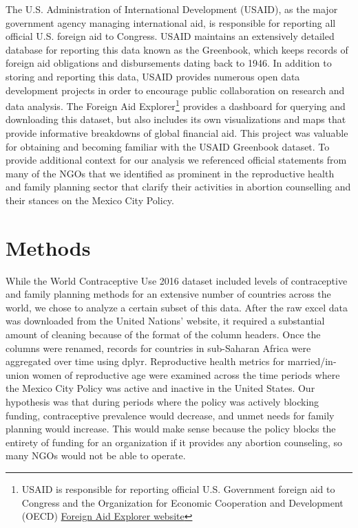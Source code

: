 \documentclass[11pt,]{article}
\begin{document}
The U.S. Administration of International Development (USAID), as the
major government agency managing international aid, is responsible for
reporting all official U.S. foreign aid to Congress. USAID maintains an
extensively detailed database for reporting this data known as the
Greenbook, which keeps records of foreign aid obligations and
disbursements dating back to 1946. In addition to storing and reporting
this data, USAID provides numerous open data development projects in
order to encourage public collaboration on research and data analysis.
The Foreign Aid Explorer\footnote{USAID is responsible for reporting
  official U.S. Government foreign aid to Congress and the Organization
  for Economic Cooperation and Development (OECD)
  \href{https://explorer.usaid.gov/aid-dashboard.html}{Foreign Aid
  Explorer website}} provides a dashboard for querying and downloading
this dataset, but also includes its own visualizations and maps that
provide informative breakdowns of global financial aid. This project was
valuable for obtaining and becoming familiar with the USAID Greenbook
dataset. To provide additional context for our analysis we referenced
official statements from many of the NGOs that we identified as
prominent in the reproductive health and family planning sector that
clarify their activities in abortion counselling and their stances on
the Mexico City Policy.

\section{Methods}\label{methods}

While the World Contraceptive Use 2016 dataset included levels of
contraceptive and family planning methods for an extensive number of
countries across the world, we chose to analyze a certain subset of this
data. After the raw excel data was downloaded from the United Nations'
website, it required a substantial amount of cleaning because of the
format of the column headers. Once the columns were renamed, records for
countries in sub-Saharan Africa were aggregated over time using dplyr.
Reproductive health metrics for married/in-union women of reproductive
age were examined across the time periods where the Mexico City Policy
was active and inactive in the United States. Our hypothesis was that
during periods where the policy was actively blocking funding,
contraceptive prevalence would decrease, and unmet needs for family
planning would increase. This would make sense because the policy blocks
the entirety of funding for an organization if it provides any abortion
counseling, so many NGOs would not be able to operate.
\end{document}
